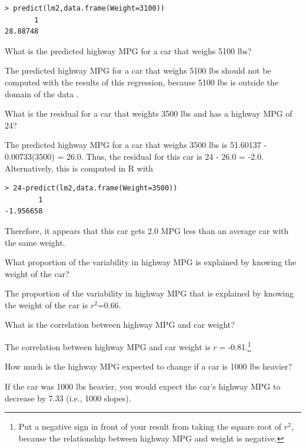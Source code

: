 \documentclass[10pt,openany]{book}\usepackage[]{graphicx}\usepackage[]{color}
\makeatletter
\newenvironment{kframe}{%
 \def\at@end@of@kframe{}%
 \ifinner\ifhmode%
  \def\at@end@of@kframe{\end{minipage}}%
  \begin{minipage}{\columnwidth}%
 \fi\fi%
 \def\FrameCommand##1{\hskip\@totalleftmargin \hskip-\fboxsep
 \colorbox{shadecolor}{##1}\hskip-\fboxsep
     \hskip-\linewidth \hskip-\@totalleftmargin \hskip\columnwidth}%
 \MakeFramed {\advance\hsize-\width
   \@totalleftmargin\z@ \linewidth\hsize
   \@setminipage}}%
 {\par\unskip\endMakeFramed%
 \at@end@of@kframe}
\newenvironment{knitrout}{}{} %
\makeatother
\begin{document}
\begin{QAlist}
\begin{QAlist}
\begin{knitrout}
\begin{kframe}
\begin{verbatim}
> predict(lm2,data.frame(Weight=3100))
       1 
28.88748 
\end{verbatim}
\end{kframe}
\end{knitrout}
  \end{QAlist}
  \item What is the predicted highway MPG for a car that weighs 5100 lbs?
  \begin{QAlist}
    \item The predicted highway MPG for a car that weighs 5100 lbs should not be computed with the results of this regression, because 5100 lbs is outside the domain of the data .
  \end{QAlist}
  \item What is the residual for a car that weights 3500 lbs and has a highway MPG of 24?
  \begin{QAlist}
    \item The predicted highway MPG for a car that weighs 3500 lbs is 51.60137 - 0.00733(3500) = 26.0. Thus, the residual for this car is 24 - 26.0 = -2.0. Alternatively, this is computed in R with
\begin{knitrout}
\color{fgcolor}\begin{kframe}
\begin{verbatim}
> 24-predict(lm2,data.frame(Weight=3500))
        1 
-1.956658 
\end{verbatim}
\end{kframe}
\end{knitrout}
Therefore, it appears that this car gets 2.0 MPG less than an average car with the same weight.
  \end{QAlist}
  \item What proportion of the variability in highway MPG is explained by knowing the weight of the car?
  \begin{QAlist}
    \item The proportion of the variability in highway MPG that is explained by knowing the weight of the car is $r^{2}$=0.66.
  \end{QAlist}
  \item What is the correlation between highway MPG and car weight?
  \begin{QAlist}
    \item The correlation between highway MPG and car weight is $r=$-0.81.\footnote{Put a negative sign in front of your result from taking the square root of $r^2$, because the relationship between highway MPG and weight is negative.}
  \end{QAlist}
  \item How much is the highway MPG expected to change if a car is 1000 lbs heavier?
  \begin{QAlist}
    \item If the car was 1000 lbs heavier, you would expect the car's highway MPG to decrease by 7.33 (i.e., 1000 slopes).
  \end{QAlist}
\end{QAlist}
\end{document}
